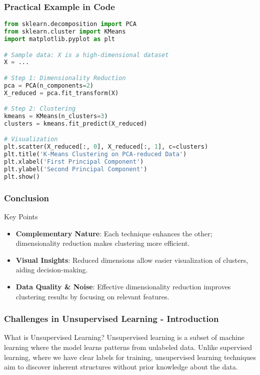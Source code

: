 \documentclass[aspectratio=169]{beamer}
\begin{document}
\begin{frame}[fragile]
    \frametitle{Practical Example in Code}
    \begin{lstlisting}[language=Python]
from sklearn.decomposition import PCA
from sklearn.cluster import KMeans
import matplotlib.pyplot as plt

# Sample data: X is a high-dimensional dataset
X = ...

# Step 1: Dimensionality Reduction
pca = PCA(n_components=2)
X_reduced = pca.fit_transform(X)

# Step 2: Clustering
kmeans = KMeans(n_clusters=3)
clusters = kmeans.fit_predict(X_reduced)

# Visualization
plt.scatter(X_reduced[:, 0], X_reduced[:, 1], c=clusters)
plt.title('K-Means Clustering on PCA-reduced Data')
plt.xlabel('First Principal Component')
plt.ylabel('Second Principal Component')
plt.show()
    \end{lstlisting}
\end{frame}

\begin{frame}[fragile]
    \frametitle{Conclusion}
    \begin{block}{Key Points}
        \begin{itemize}
            \item \textbf{Complementary Nature}: Each technique enhances the other; dimensionality reduction makes clustering more efficient.
            \item \textbf{Visual Insights}: Reduced dimensions allow easier visualization of clusters, aiding decision-making.
            \item \textbf{Data Quality \& Noise}: Effective dimensionality reduction improves clustering results by focusing on relevant features.
        \end{itemize}
    \end{block}
\end{frame}

\begin{frame}[fragile]
    \frametitle{Challenges in Unsupervised Learning - Introduction}
    \begin{block}{What is Unsupervised Learning?}
        Unsupervised learning is a subset of machine learning where the model learns patterns from unlabeled data. 
        Unlike supervised learning, where we have clear labels for training, unsupervised learning techniques aim to discover inherent structures without prior knowledge about the data.
    \end{block}
\end{frame}
\end{document}
